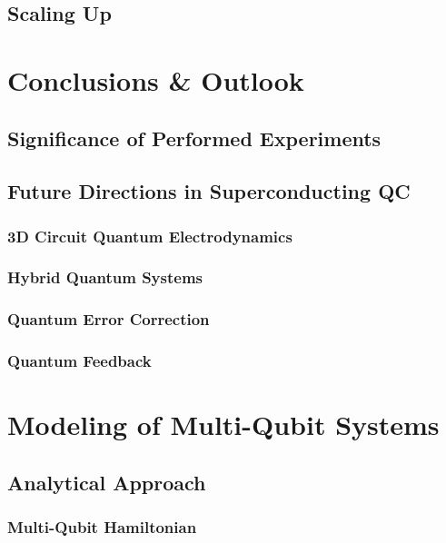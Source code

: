 \documentclass{scrbook}
\begin{document}
\section{Scaling Up}

\chapter{Conclusions \& Outlook}

\section{Significance of Performed Experiments}

\section{Future Directions in Superconducting QC}

\subsection{3D Circuit Quantum Electrodynamics}

\subsection{Hybrid Quantum Systems}

\subsection{Quantum Error Correction}

\subsection{Quantum Feedback}

\appendix

\chapter{Modeling of Multi-Qubit Systems}

\section{Analytical Approach}

\subsection{Multi-Qubit Hamiltonian}
\end{document}
